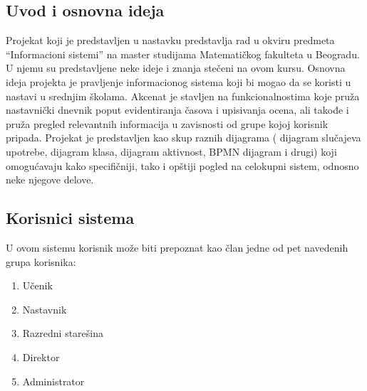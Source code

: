 \documentclass{article}
\begin{document}
\subsection{Uvod i osnovna ideja}
	Projekat koji je predstavljen u nastavku predstavlja rad u okviru predmeta ``Informacioni sistemi'' na master studijama Matematičkog fakulteta u Beogradu. U njemu su predstavljene neke ideje i znanja stečeni na ovom kursu.
	Osnovna ideja projekta je pravljenje informacionog sistema koji bi mogao da se koristi u nastavi u srednjim školama. Akcenat je stavljen na funkcionalnostima koje pruža nastavnički dnevnik poput evidentiranja časova i upisivanja ocena, ali takođe i pruža pregled relevantnih informacija u zavisnosti od grupe kojoj korisnik pripada. Projekat je predstavljen kao skup raznih dijagrama ( dijagram slučajeva upotrebe, dijagram klasa, dijagram aktivnost, BPMN dijagram i drugi) koji omogućavaju kako specifičniji, tako i opštiji pogled na celokupni sistem, odnosno neke njegove delove.

\subsection{Korisnici sistema}
	U ovom sistemu korisnik može biti prepoznat kao član jedne od pet navedenih grupa korisnika:
\begin{enumerate}
	\item Učenik
	\item Nastavnik
	\item Razredni starešina
	\item Direktor
	\item Administrator
\end{enumerate}
\end{document}
